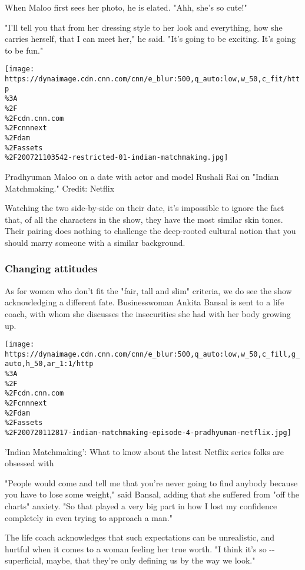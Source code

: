 When Maloo first sees her photo, he is elated. "Ahh, she's so cute!"

"I'll tell you that from her dressing style to her look and everything,
how she carries herself, that I can meet her," he said. "It's going to
be exciting. It's going to be fun."

\texttt{[image: https://dynaimage.cdn.cnn.com/cnn/e\_blur:500,q\_auto:low,w\_50,c\_fit/http\\\%3A\\\%2F\\\%2Fcdn.cnn.com\\\%2Fcnnnext\\\%2Fdam\\\%2Fassets\\\%2F200721103542-restricted-01-indian-matchmaking.jpg]}

Pradhyuman Maloo on a date with actor and model Rushali Rai on "Indian
Matchmaking." Credit: Netflix

Watching the two side-by-side on their date, it's impossible to ignore
the fact that, of all the characters in the show, they have the most
similar skin tones. Their pairing does nothing to challenge the
deep-rooted cultural notion that you should marry someone with a similar
background.

\hypertarget{changing-attitudes}{%
\subsubsection{Changing attitudes}\label{changing-attitudes}}

As for women who don't fit the "fair, tall and slim" criteria, we do see
the show acknowledging a different fate. Businesswoman Ankita Bansal is
sent to a life coach, with whom she discusses the insecurities she had
with her body growing up.

\href{/2020/07/20/entertainment/indian-matchmaking-netflix/index.html}{}

\texttt{[image: https://dynaimage.cdn.cnn.com/cnn/e\_blur:500,q\_auto:low,w\_50,c\_fill,g\_auto,h\_50,ar\_1:1/http\\\%3A\\\%2F\\\%2Fcdn.cnn.com\\\%2Fcnnnext\\\%2Fdam\\\%2Fassets\\\%2F200720112817-indian-matchmaking-episode-4-pradhyuman-netflix.jpg]}

'Indian Matchmaking': What to know about the latest Netflix series folks
are obsessed with

"People would come and tell me that you're never going to find anybody
because you have to lose some weight," said Bansal, adding that she
suffered from "off the charts" anxiety. "So that played a very big part
in how I lost my confidence completely in even trying to approach a
man."

The life coach acknowledges that such expectations can be unrealistic,
and hurtful when it comes to a woman feeling her true worth. "I think
it's so -\/- superficial, maybe, that they're only defining us by the
way we look."

